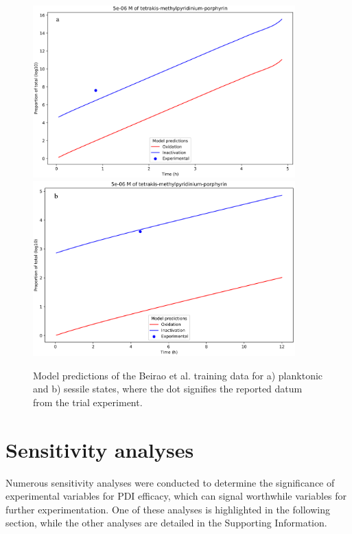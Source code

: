 \begin{figure}
    \centering
    \includegraphics[width = 0.9\textwidth]{images/PDIpy/training/5uM.png}
    \includegraphics[width = 0.9\textwidth]{images/PDIpy/training/5uM_biofilm.png}
    \caption{
        Model predictions of the Beirao et al. training data for a) planktonic and b) sessile states, where the dot signifies the reported datum from the trial experiment.
    }
    \label{beirao_et_al}
\end{figure}

\section*{Sensitivity analyses}

Numerous sensitivity analyses were conducted to determine the significance of experimental variables for PDI efficacy, which can signal worthwhile variables for further experimentation. One of these analyses is highlighted in the following section, while the other analyses are detailed in the Supporting Information. 

